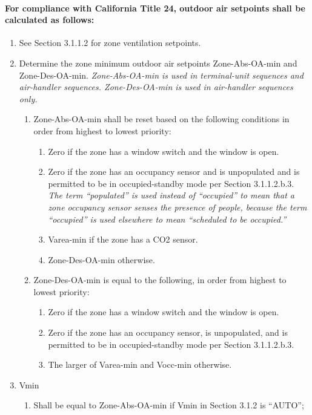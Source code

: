 \documentclass[10pt]{article}
\begin{document}
  \paragraph{For compliance with California Title 24, outdoor air setpoints shall be calculated as follows:}
  \begin{enumerate}
    \item See Section 3.1.1.2 for zone ventilation setpoints.
    \item Determine the zone minimum outdoor air setpoints Zone-Abs-OA-min and Zone-Des-OA-min.
    \textit{Zone-Abs-OA-min is used in terminal-unit sequences and air-handler sequences. Zone-Des-OA-min is used in air-handler sequences only.}
    \begin{enumerate}
      \item Zone-Abs-OA-min shall be reset based on the following conditions in order from highest to lowest priority:
      \begin{enumerate}
        \item Zero if the zone has a window switch and the window is open.
        \item Zero if the zone has an occupancy sensor and is unpopulated and is permitted to be in occupied-standby mode per Section 3.1.1.2.b.3.
        \textit{The term “populated” is used instead of “occupied” to mean that a zone occupancy sensor senses the presence of people, because the term “occupied” is used elsewhere to mean “scheduled to be occupied.”}
        \item Varea-min if the zone has a CO2 sensor.
        \item Zone-Des-OA-min otherwise.
      \end{enumerate}
      \item Zone-Des-OA-min is equal to the following, in order from highest to lowest priority:
      \begin{enumerate}
        \item Zero if the zone has a window switch and the window is open.
        \item Zero if the zone has an occupancy sensor, is unpopulated, and is permitted to be in occupied-standby mode per Section 3.1.1.2.b.3.
        \item The larger of Varea-min and Vocc-min otherwise.
      \end{enumerate}
    \end{enumerate}
    \item Vmin
    \begin{enumerate}
      \item Shall be equal to Zone-Abs-OA-min if Vmin in Section 3.1.2 is “AUTO”;

\end{enumerate}
\end{enumerate}
\end{document}
